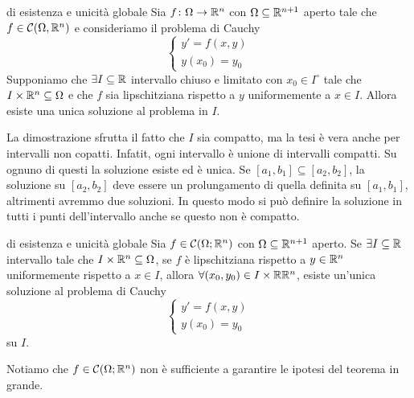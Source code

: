 \documentclass[a4paper]{article}
\begin{document}
\begin{snippettheorem}{di esistenza e unicità globale}
    Sia \(f\colon \Omega \to \mathbb{R}^n\) con \(\Omega \subseteq \mathbb{R}^{n+1}\) aperto
    tale che \(f \in \mathcal C(\Omega, \mathbb{R}^n)\)
    e consideriamo il problema di Cauchy
    \[
        \begin{cases}
            y' = f(x,y) \\
            y(x_0) = y_0
        \end{cases}
    \]
    Supponiamo che \(\exists I \subseteq \mathbb{R}\) intervallo
    chiuso e limitato con \(x_0 \in I^\circ\) tale che \(I \times \mathbb{R}^n \subseteq \Omega\) e che \(f\)
    sia lipschitziana rispetto a \(y\) uniformemente a \(x\in I\). Allora esiste una unica soluzione al problema in \(I\).
\end{snippettheorem}

La dimostrazione sfrutta il fatto che \(I\) sia compatto, ma la tesi è vera anche per intervalli non copatti.
Infatit, ogni intervallo è unione di intervalli compatti.
Su ognuno di questi la soluzione esiste ed è unica.
Se \([a_1, b_1] \subseteq [a_2, b_2]\), la soluzione su \([a_2, b_2]\) deve essere un prolungamento
di quella definita su \([a_1, b_1]\), altrimenti avremmo due soluzioni.
In questo modo si può definire la soluzione in tutti i punti
dell'intervallo anche se questo non è compatto.

\begin{snippettheorem}{di esistenza e unicità globale}
    Sia \(f \in \mathcal C(\Omega; \mathbb{R}^n)\) con \(\Omega \subseteq \mathbb{R}^{n+1}\) aperto.
    Se \(\exists I \subseteq \mathbb{R}\) intervallo tale che
    \(I \times \mathbb{R}^n \subseteq \Omega\), se \(f\) è lipschitziana rispetto a \(y \in \mathbb{R}^n\) uniformemente
    rispetto a \(x\in I\), allora \(\forall (x_0, y_0) \in I \times \mathbb{R} \mathbb{R}^n\),
    esiste un'unica soluzione al problema di Cauchy
    \[
                \begin{cases}
            y' = f(x,y) \\
            y(x_0) = y_0
        \end{cases}
    \]
    su \(I\).
\end{snippettheorem}

Notiamo che \(f \in \mathcal C(\Omega; \mathbb{R}^n)\) non è sufficiente a garantire le ipotesi del teorema in grande.
\end{document}
